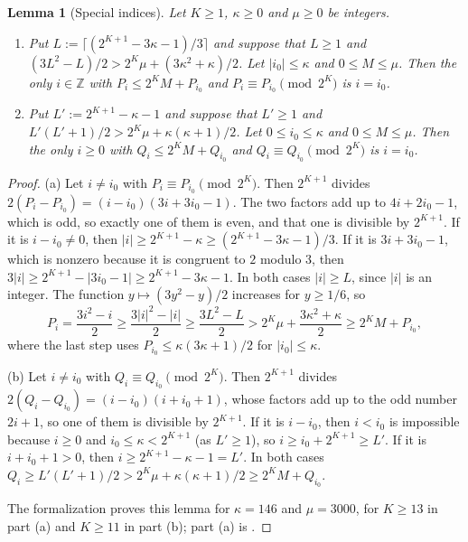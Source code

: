 \documentclass[12pt]{amsart}
\newtheorem{lemma}[theorem]{Lemma}
\theoremstyle{definition}
\newcommand{\Z}{\mathbb{Z}}
\newcommand{\lean}[1]{\ignorespaces}
\begin{document}
\begin{lemma}[Special indices]\label{lem:special}
\lean{\decl{KeithZanello.special_pent} for part (a) with $K\ge13$, and \decl{KeithZanello.special_tri} for part (b) with $K\ge11$, both with $\kappa=146$ and $\mu=3000$}
Let $K\ge1$, $\kappa\ge0$ and $\mu\ge0$ be integers.
\begin{enumerate}
\item[(a)] Put $L:=\lceil(2^{K+1}-3\kappa-1)/3\rceil$ and suppose that $L\ge1$ and $(3L^2-L)/2>2^K\mu+(3\kappa^2+\kappa)/2$. Let $|i_0|\le\kappa$ and $0\le M\le\mu$. Then the only $i\in\Z$ with $P_i\le2^KM+P_{i_0}$ and $P_i\equiv P_{i_0}\pmod{2^K}$ is $i=i_0$.
\item[(b)] Put $L':=2^{K+1}-\kappa-1$ and suppose that $L'\ge1$ and $L'(L'+1)/2>2^K\mu+\kappa(\kappa+1)/2$. Let $0\le i_0\le\kappa$ and $0\le M\le\mu$. Then the only $i\ge0$ with $Q_i\le2^KM+Q_{i_0}$ and $Q_i\equiv Q_{i_0}\pmod{2^K}$ is $i=i_0$.
\end{enumerate}
\end{lemma}

\begin{proof}
(a) Let $i\ne i_0$ with $P_i\equiv P_{i_0}\pmod{2^K}$. Then $2^{K+1}$ divides $2(P_i-P_{i_0})=(i-i_0)(3i+3i_0-1)$. The two factors add up to $4i+2i_0-1$, which is odd, so exactly one of them is even, and that one is divisible by $2^{K+1}$. If it is $i-i_0\ne0$, then $|i|\ge2^{K+1}-\kappa\ge(2^{K+1}-3\kappa-1)/3$. If it is $3i+3i_0-1$, which is nonzero because it is congruent to $2$ modulo $3$, then $3|i|\ge2^{K+1}-|3i_0-1|\ge2^{K+1}-3\kappa-1$. In both cases $|i|\ge L$, since $|i|$ is an integer. The function $y\mapsto(3y^2-y)/2$ increases for $y\ge1/6$, so
\[
P_i=\frac{3i^2-i}{2}\ge\frac{3|i|^2-|i|}{2}\ge\frac{3L^2-L}{2}>2^K\mu+\frac{3\kappa^2+\kappa}{2}\ge2^KM+P_{i_0},
\]
where the last step uses $P_{i_0}\le\kappa(3\kappa+1)/2$ for $|i_0|\le\kappa$.

(b) Let $i\ne i_0$ with $Q_i\equiv Q_{i_0}\pmod{2^K}$. Then $2^{K+1}$ divides $2(Q_i-Q_{i_0})=(i-i_0)(i+i_0+1)$, whose factors add up to the odd number $2i+1$, so one of them is divisible by $2^{K+1}$. If it is $i-i_0$, then $i<i_0$ is impossible because $i\ge0$ and $i_0\le\kappa<2^{K+1}$ (as $L'\ge1$), so $i\ge i_0+2^{K+1}\ge L'$. If it is $i+i_0+1>0$, then $i\ge2^{K+1}-\kappa-1=L'$. In both cases $Q_i\ge L'(L'+1)/2>2^K\mu+\kappa(\kappa+1)/2\ge2^KM+Q_{i_0}$.

The formalization proves this lemma for $\kappa=146$ and $\mu=3000$, for $K\ge13$ in part (a) and $K\ge11$ in part (b); part (a) is .
\end{proof}
\end{document}
